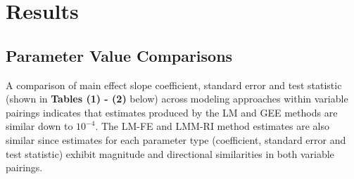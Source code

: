 \documentclass[12pt,]{article}
\begin{document}
\hypertarget{results}{%
\section{Results}\label{results}}

\hypertarget{parameter-value-comparisons}{%
\subsection{Parameter Value
Comparisons}\label{parameter-value-comparisons}}

A comparison of main effect slope coefficient, standard error and test
statistic (shown in \textbf{Tables (1) - (2)} below) across modeling
approaches within variable pairings indicates that estimates produced by
the LM and GEE methods are similar down to \(10^{-4}\). The LM-FE and
LMM-RI method estimates are also similar since estimates for each
parameter type (coefficient, standard error and test statistic) exhibit
magnitude and directional similarities in both variable pairings.

\vspace{5pt}
\end{document}
